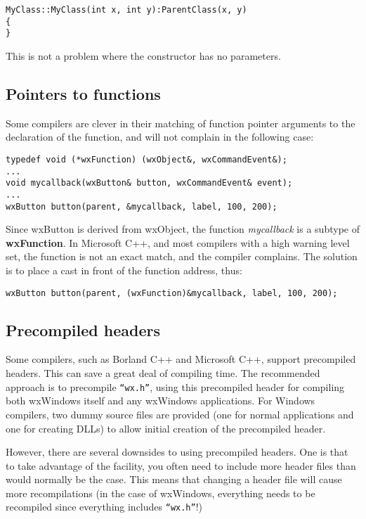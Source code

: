 \begin{verbatim}
MyClass::MyClass(int x, int y):ParentClass(x, y)
{
}
\end{verbatim}

This is not a problem where the constructor has no parameters.

\subsection{Pointers to functions}\label{functionprob}

Some compilers are clever in their matching of function pointer
arguments to the declaration of the function, and will not complain in
the following case:

\begin{verbatim}
typedef void (*wxFunction) (wxObject&, wxCommandEvent&);
...
void mycallback(wxButton& button, wxCommandEvent& event);
...
wxButton button(parent, &mycallback, label, 100, 200);
\end{verbatim}

Since wxButton is derived from wxObject, the function {\it mycallback}
is a subtype of {\bf wxFunction}.  In Microsoft C++, and most compilers
with a high warning level set, the function is not an exact match, and
the compiler complains. The solution is to place a cast in front of the
function address, thus:

\begin{verbatim}
wxButton button(parent, (wxFunction)&mycallback, label, 100, 200);
\end{verbatim}

\subsection{Precompiled headers}

Some compilers, such as Borland C++ and Microsoft C++, support
precompiled headers. This can save a great deal of compiling time. The
recommended approach is to precompile {\tt ``wx.h''}, using this
precompiled header for compiling both wxWindows itself and any
wxWindows applications. For Windows compilers, two dummy source files
are provided (one for normal applications and one for creating DLLs)
to allow initial creation of the precompiled header.

However, there are several downsides to using precompiled headers. One
is that to take advantage of the facility, you often need to include
more header files than would normally be the case. This means that
changing a header file will cause more recompilations (in the case of
wxWindows, everything needs to be recompiled since everything includes
{\tt ``wx.h''}!)

